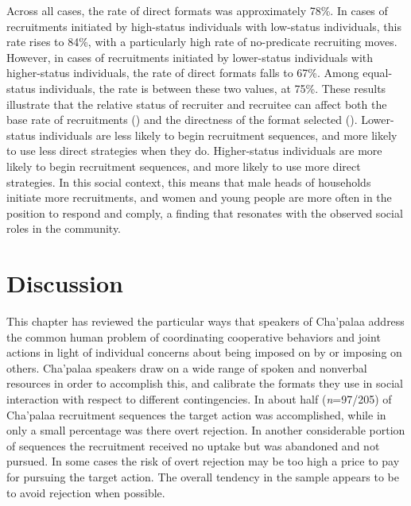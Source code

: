 \documentclass[output=paper]{langsci/langscibook}
\begin{document}
Across all cases, the rate of direct formats was approximately 78\%. In cases of recruitments initiated by high-status individuals with low-status individuals, this rate rises to 84\%, with a particularly high rate of no-predicate recruiting moves. However, in cases of recruitments initiated by lower-status individuals with higher-status individuals, the rate of direct formats falls to 67\%. Among equal-status individuals, the rate is between these two values, at 75\%. These results illustrate that the relative status of recruiter and recruitee can affect both the base rate of recruitments () and the directness of the format selected (). Lower-status individuals are less likely to begin recruitment sequences, and more likely to use less direct strategies when they do. Higher-status individuals are more likely to begin recruitment sequences, and more likely to use more direct strategies. In this social context, this means that male heads of households initiate more recruitments, and women and young people are more often in the position to respond and comply, a finding that resonates with the observed social roles in the community.

\section{Discussion}

This chapter has reviewed the particular ways that speakers of Cha’palaa address the common human problem of coordinating cooperative behaviors and joint actions in light of individual concerns about being imposed on by or imposing on others. Cha’palaa speakers draw on a wide range of spoken and nonverbal resources in order to accomplish this, and calibrate the formats they use in social interaction with respect to different contingencies. In about half (\textit{n}=97/205) of Cha'palaa recruitment sequences the target action was accomplished, while in only a small percentage was there overt rejection. In another considerable portion of sequences the recruitment received no uptake but was abandoned and not pursued. In some cases the risk of overt rejection may be too high a price to pay for pursuing the target action. The overall tendency in the sample appears to be to avoid rejection when possible.
\end{document}

